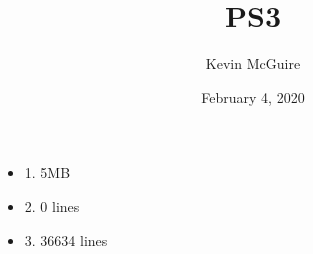 \documentclass{article}
\title{PS3}
\author{Kevin McGuire}
\date{February 4, 2020}
\begin{document}
\maketitle

\begin{itemize}
    \item 1. 5MB
    \item 2. 0 lines
    \item 3. 36634 lines
    
\end{itemize}
\end{document}
